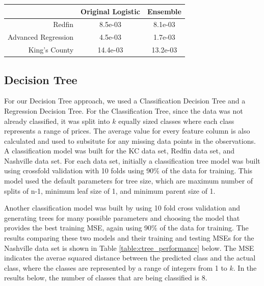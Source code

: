 \documentclass[10pt]{article}
\begin{document}
\begin{multicols}{2}
		\par
        	\captionsetup{type=table}
			\begin{tabular}{r|c|c}
				& \small{Original Logistic} & \small{Ensemble} \\
				\hline
				\small{Redfin} & \small{8.5e-03} & \small{8.1e-03} \\
				\hline
				\small{Advanced Regression} & \small{4.5e-03} & \small{1.7e-03} \\
				\hline
				\small{King's County} & \small{14.4e-03} & \small{13.2e-03} \\
				\hline
			\end{tabular}
			\label{table:logr_ensemble}        
			\setlength{\parindent}{15pt}
		\subsection{Decision Tree}
		\par
		For our Decision Tree approach, we used a Classification Decision Tree and a Regression Decision Tree. For the Classification Tree, since the data was not already classified, it was split into \(k\) equally sized classes where each class represents a range of prices. The average value for every feature column is also calculated and used to subsitute for any missing data points in the observations. A classification model was built for the KC data set, Redfin data set, and Nashville data set. For each data set, initially a classification tree model was built using crossfold validation with 10 folds using 90\% of the data for training. This model used the default parameters for tree size, which are maximum number of splits of n-1, minimum leaf size of 1, and minimum parent size of 1. 
		\par		
Another classification model was built by using 10 fold cross validation and generating trees for many possible parameters and choosing the model that provides the best training MSE, again using 90\% of the data for training. The results comparing these two models and their training and testing MSEs for the Nashville data set is shown in Table \ref{table:ctree_performance} below. The MSE indicates the averae squared distance between the predicted class and the actual class, where the classes are represented by a range of integers from 1 to \(k\). In the results below, the number of classes that are being classified is 8.
		\par
		\captionsetup{type=table}
			\begin{tabular}{r|c}

\end{tabular}
\end{multicols}
\end{document}
